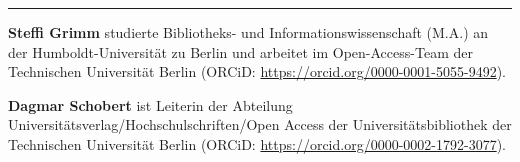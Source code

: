 \begin{center}\rule{0.5\linewidth}{\linethickness}\end{center}

\textbf{Steffi Grimm} studierte Bibliotheks- und
Informationswissenschaft (M.A.) an der Humboldt-Universität zu Berlin
und arbeitet im Open-Access-Team der Technischen Universität Berlin
(ORCiD: \url{https://orcid.org/0000-0001-5055-9492}).

\textbf{Dagmar Schobert} ist Leiterin der Abteilung
Universitätsverlag/Hochschulschriften/Open Access der
Universitätsbibliothek der Technischen Universität Berlin (ORCiD:
\url{https://orcid.org/0000-0002-1792-3077}).

